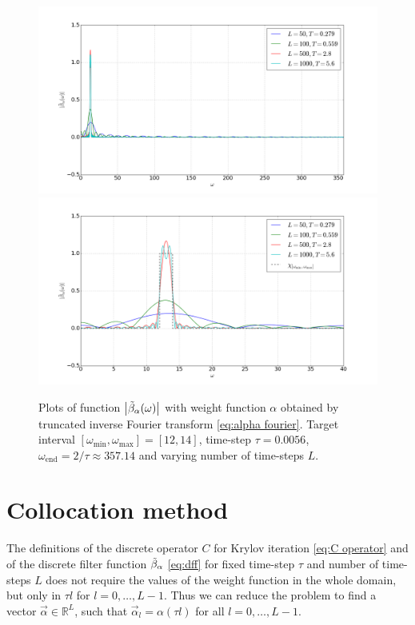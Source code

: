 \documentclass[a4paper,11pt,bibliography=totoc,listof=totoc,headinclude=true,cleardoublepage=empty,oneside]{scrbook}
\newcommand{\R}{\mathbb{R}}
\newcommand{\dff}{\Tilde{\beta}_\alpha}
\newcommand{\e}{\mathrm{end}}
\begin{document}
\begin{figure}
    \centering
    \includegraphics[width=1\linewidth]{latex//images//fourier/Figure_4.png}
    \includegraphics[width=1\linewidth]{latex//images//fourier/Figure_5.png}
    \caption{Plots of function $\left|\dff(\omega) \right|$ with weight function $\alpha$ obtained by truncated inverse Fourier transform \eqref{eq:alpha fourier}. Target interval $\left[\omega_{\min}, \omega_{\max} \right] = [12, 14]$, time-step $\tau = 0.0056$, $\omega_\e = 2/\tau \approx 357.14$ and varying number of time-steps $L$. }
    \label{fig:fourier2}
\end{figure}

\section{Collocation method}\label{section:collocation}
The definitions of the discrete operator $C$ for Krylov iteration \eqref{eq:C operator} and of the discrete filter function $\dff$ \eqref{eq:dff} for fixed time-step $\tau$ and number of time-steps $L$ does not require the values of the weight function in the whole domain, but only in $\tau l$ for $l=0, \dots, L-1$. Thus we can reduce the problem to find a vector $\Vec{\alpha} \in \R^L$, such that $\Vec{\alpha}_l = \alpha(\tau l)$ for all $l=0, \dots, L-1$.
\end{document}
